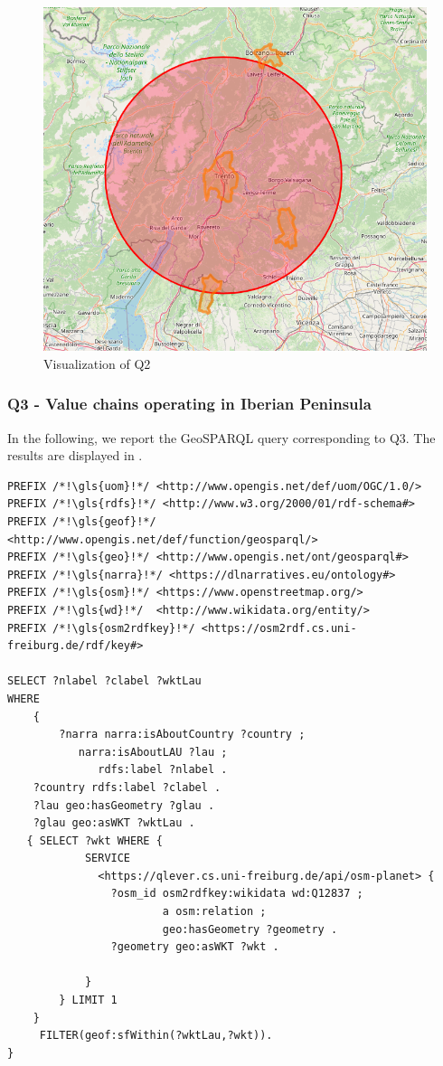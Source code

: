 \begin{figure}[h!tb]
    \centerline {\includegraphics[scale=0.6]{img/trento.png}}
    \caption{Visualization of Q2}
    \label{fig:trento}
\end{figure}

\subsubsection*{Q3 - Value chains operating in Iberian Peninsula}
In the following, we report the GeoSPARQL query corresponding to Q3. The results are displayed in .

\begin{lstlisting}[caption=GeoSPARQL Query 3, label={lst:query3}]
PREFIX /*!\gls{uom}!*/ <http://www.opengis.net/def/uom/OGC/1.0/>
PREFIX /*!\gls{rdfs}!*/ <http://www.w3.org/2000/01/rdf-schema#>
PREFIX /*!\gls{geof}!*/ <http://www.opengis.net/def/function/geosparql/> 
PREFIX /*!\gls{geo}!*/ <http://www.opengis.net/ont/geosparql#>
PREFIX /*!\gls{narra}!*/ <https://dlnarratives.eu/ontology#>
PREFIX /*!\gls{osm}!*/ <https://www.openstreetmap.org/>
PREFIX /*!\gls{wd}!*/  <http://www.wikidata.org/entity/>
PREFIX /*!\gls{osm2rdfkey}!*/ <https://osm2rdf.cs.uni-freiburg.de/rdf/key#>

SELECT ?nlabel ?clabel ?wktLau 
WHERE  
    {   
        ?narra narra:isAboutCountry ?country ;
           narra:isAboutLAU ?lau ;
    	      rdfs:label ?nlabel .
    ?country rdfs:label ?clabel .
    ?lau geo:hasGeometry ?glau .
    ?glau geo:asWKT ?wktLau .
   { SELECT ?wkt WHERE {
        	SERVICE 
      		  <https://qlever.cs.uni-freiburg.de/api/osm-planet> { 
            	?osm_id osm2rdfkey:wikidata wd:Q12837 ;
                        a osm:relation ;
                        geo:hasGeometry ?geometry .
                ?geometry geo:asWKT ?wkt .
                
        	} 
    	} LIMIT 1
  	}
     FILTER(geof:sfWithin(?wktLau,?wkt)). 
}
\end{lstlisting}

